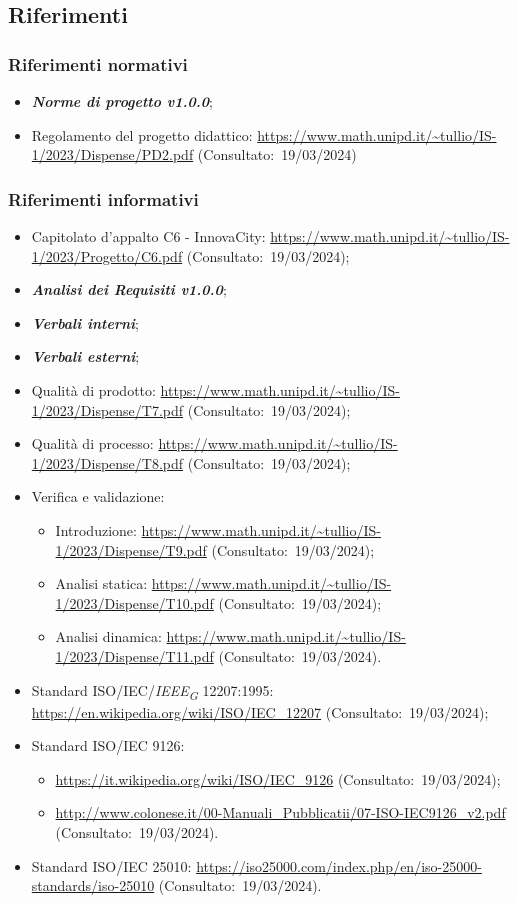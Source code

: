 \subsection{Riferimenti}
\subsubsection{Riferimenti normativi}
\begin{itemize}
    \item \textbf{\textit{Norme di progetto v1.0.0}};
    \item Regolamento del progetto didattico: \url{https://www.math.unipd.it/~tullio/IS-1/2023/Dispense/PD2.pdf} (Consultato:~19/03/2024)
\end{itemize}
\subsubsection{Riferimenti informativi}
\begin{itemize}
    \item Capitolato d’appalto C6 - InnovaCity: \url{https://www.math.unipd.it/~tullio/IS-1/2023/Progetto/C6.pdf} (Consultato:~19/03/2024);
    \item \textbf{\textit{Analisi dei Requisiti v1.0.0}};
    \item \textbf{\textit{Verbali interni}};
    \item \textbf{\textit{Verbali esterni}};
    \item Qualità di prodotto: \url{https://www.math.unipd.it/~tullio/IS-1/2023/Dispense/T7.pdf} (Consultato:~19/03/2024);
    \item Qualità di processo: \url{https://www.math.unipd.it/~tullio/IS-1/2023/Dispense/T8.pdf} (Consultato:~19/03/2024);
    \item Verifica e validazione: \begin{itemize}
    \item Introduzione: \url{https://www.math.unipd.it/~tullio/IS-1/2023/Dispense/T9.pdf} (Consultato:~19/03/2024);
    \item Analisi statica: \url{https://www.math.unipd.it/~tullio/IS-1/2023/Dispense/T10.pdf} (Consultato:~19/03/2024);
    \item Analisi dinamica: \url{https://www.math.unipd.it/~tullio/IS-1/2023/Dispense/T11.pdf} (Consultato:~19/03/2024).
    \end{itemize}
    \item Standard ISO/IEC/\textit{IEEE}\textsubscript{\textit{G}} 12207:1995: \url{https://en.wikipedia.org/wiki/ISO/IEC_12207} (Consultato:~19/03/2024);
    \item Standard ISO/IEC 9126: \begin{itemize}
        \item \url{https://it.wikipedia.org/wiki/ISO/IEC_9126} (Consultato:~19/03/2024);
        \item \url{http://www.colonese.it/00-Manuali_Pubblicatii/07-ISO-IEC9126_v2.pdf} (Consultato:~19/03/2024).
    \end{itemize}
    \item Standard ISO/IEC 25010: \url{https://iso25000.com/index.php/en/iso-25000-standards/iso-25010} (Consultato:~19/03/2024).
\end{itemize}
